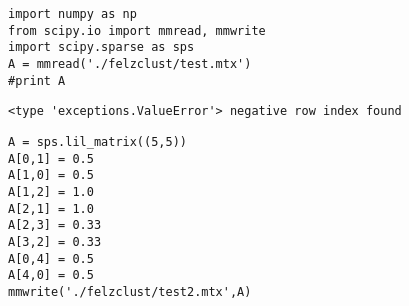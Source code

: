 \documentclass[12pt,fleqn]{article}\usepackage{../common}
\begin{document}
\begin{verbatim}
import numpy as np
from scipy.io import mmread, mmwrite
import scipy.sparse as sps
A = mmread('./felzclust/test.mtx')
#print A
\end{verbatim}

\begin{verbatim}
<type 'exceptions.ValueError'> negative row index found
\end{verbatim}

\begin{verbatim}
A = sps.lil_matrix((5,5))
A[0,1] = 0.5
A[1,0] = 0.5
A[1,2] = 1.0
A[2,1] = 1.0
A[2,3] = 0.33
A[3,2] = 0.33
A[0,4] = 0.5
A[4,0] = 0.5
mmwrite('./felzclust/test2.mtx',A)
\end{verbatim}
\end{document}
